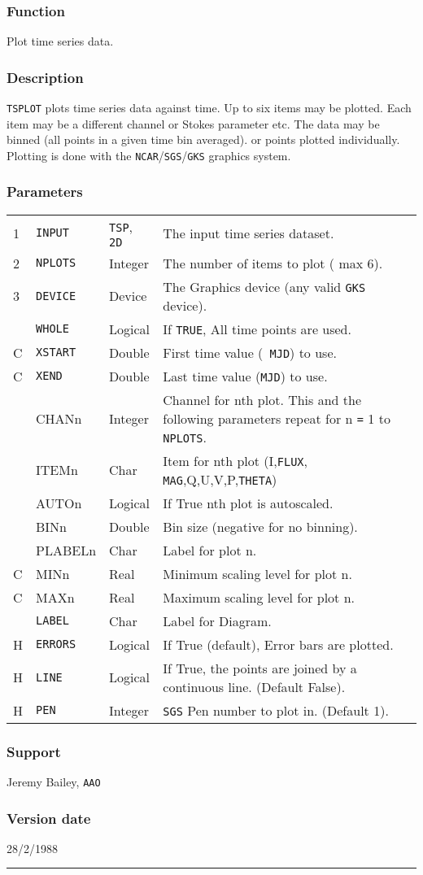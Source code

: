 \documentclass[11pt,twoside,nolof,noabs]{starlink}
\newenvironment{manroutinedescription}{}{\par{}\rule{\textwidth}{0.5mm}}
\newcommand{\manroutineitem}[2]{\subsubsection*{#1}#2\par{}}
\newenvironment{manparametertable}{\begin{tabular}{lllp{80mm}}}%
{\end{tabular}}
\newcommand{\manparameterentry}[3]{\\#1 & #2 & #3 & }
\providecommand{\mantt}[1]{\texttt{#1}}
\begin{document}
\begin{manroutinedescription}
\manroutineitem{Function}{}
        Plot time series data.

\manroutineitem{Description}{}
        {\mantt{TSPLOT}} plots time series data against time. Up to six items %
may be
        plotted. Each item may be a different channel or Stokes parameter etc.
        The data may be binned (all points in a given time bin averaged).
        or points plotted individually. Plotting is done with the
        {\mantt{NCAR}}/{\mantt{SGS}}/{\mantt{GKS}} graphics system.

\manroutineitem{Parameters}{}
\begin{manparametertable}
\manparameterentry{1}{{\mantt{INPUT}}}{{\mantt{TSP}}, {\mantt{2D}}}  The input %
time series dataset.
\manparameterentry{2}{{\mantt{NPLOTS}}}{Integer}  The number of items to plot (%
max 6).
\manparameterentry{3}{{\mantt{DEVICE}}}{Device}   The Graphics device (any %
valid {\mantt{GKS}} device).
\manparameterentry{}{{\mantt{WHOLE}}}{Logical}  If {\mantt{TRUE}}, All time %
points are used.
\manparameterentry{C}{{\mantt{XSTART}}}{Double}   First time value ({\mantt{%
MJD}}) to use.
\manparameterentry{C}{{\mantt{XEND}}}{Double}   Last time value ({\mantt{MJD}}) %
to use.
\manparameterentry{}{CHANn}{Integer}  Channel for nth plot. This and the %
following
                               parameters repeat for
                               n {\mantt{=}} 1 to {\mantt{NPLOTS}}.
\manparameterentry{}{ITEMn}{Char}     Item for nth plot (I,{\mantt{FLUX}},{%
\mantt{MAG}},Q,U,V,P,{\mantt{THETA}})
\manparameterentry{}{AUTOn}{Logical}  If True nth plot is autoscaled.
\manparameterentry{}{BINn}{Double}   Bin size (negative for no binning).
\manparameterentry{}{PLABELn}{Char}     Label for plot n.
\manparameterentry{C}{MINn}{Real}     Minimum scaling level for plot n.
\manparameterentry{C}{MAXn}{Real}     Maximum scaling level for plot n.
\manparameterentry{}{{\mantt{LABEL}}}{Char}     Label for Diagram.
\manparameterentry{H}{{\mantt{ERRORS}}}{Logical}  If True (default), Error %
bars are plotted.
\manparameterentry{H}{{\mantt{LINE}}}{Logical}  If True, the points are joined %
by a
                               continuous line. (Default False).
\manparameterentry{H}{{\mantt{PEN}}}{Integer}  {\mantt{SGS}} Pen number to %
plot in. (Default 1).

\end{manparametertable}
\manroutineitem{Support}{}
         Jeremy Bailey, {\mantt{AAO}}

\manroutineitem{Version date}{}
         28/2/1988

\end{manroutinedescription}
\end{document}
